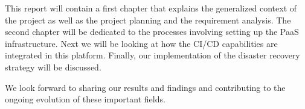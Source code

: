 This report will contain a first chapter that explains the generalized context of the project as well as the project planning and the requirement analysis. The second chapter will be dedicated to the processes involving setting up the PaaS infrastructure. Next we will be looking at how the CI/CD capabilities are integrated in this platform. Finally, our implementation of the disaster recovery strategy will be discussed.

We look forward to sharing our results and findings and contributing to the ongoing evolution of these important fields.
